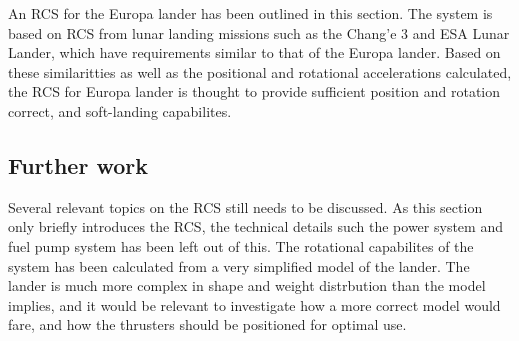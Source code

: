 An RCS for the Europa lander has been outlined in this section. The system is based on RCS from lunar landing missions such as the Chang'e 3 and ESA Lunar Lander, which have requirements similar to that of the Europa lander. Based on these similaritties as well as the positional and rotational accelerations calculated, the RCS for Europa lander is thought to provide sufficient position and rotation correct, and soft-landing capabilites. 

\subsection{Further work}

Several relevant topics on the RCS still needs to be discussed. As this section only briefly introduces the RCS, the technical details such the power system and fuel pump system has been left out of this. The rotational capabilites of the system has been calculated from a very simplified model of the lander. The lander is much more complex in shape and weight distrbution than the model implies, and it would be relevant to investigate how a more correct model would fare, and how the thrusters should be positioned for optimal use.

























